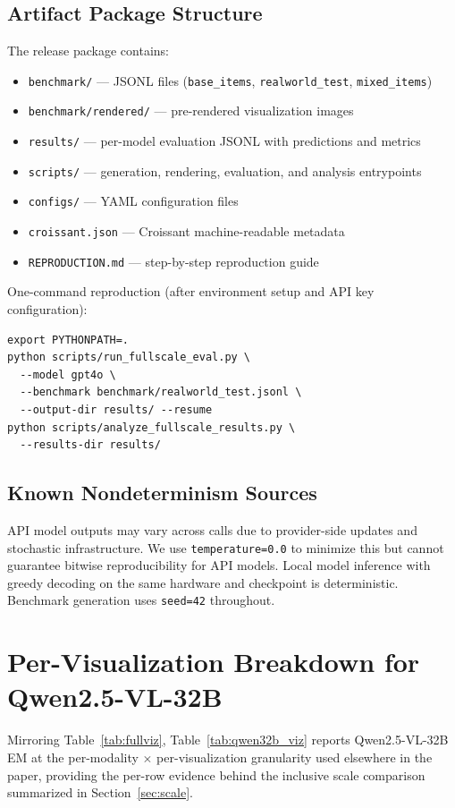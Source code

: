 \documentclass{article}
\begin{document}
\subsection{Artifact Package Structure}
The release package contains:
\begin{itemize}[leftmargin=1.5em]
    \item \texttt{benchmark/} --- JSONL files (\texttt{base\_items}, \texttt{realworld\_test}, \texttt{mixed\_items})
    \item \texttt{benchmark/rendered/} --- pre-rendered visualization images
    \item \texttt{results/} --- per-model evaluation JSONL with predictions and metrics
    \item \texttt{scripts/} --- generation, rendering, evaluation, and analysis entrypoints
    \item \texttt{configs/} --- YAML configuration files
    \item \texttt{croissant.json} --- Croissant machine-readable metadata
    \item \texttt{REPRODUCTION.md} --- step-by-step reproduction guide
\end{itemize}

One-command reproduction (after environment setup and API key configuration):
\begin{verbatim}
export PYTHONPATH=.
python scripts/run_fullscale_eval.py \
  --model gpt4o \
  --benchmark benchmark/realworld_test.jsonl \
  --output-dir results/ --resume
python scripts/analyze_fullscale_results.py \
  --results-dir results/
\end{verbatim}

\subsection{Known Nondeterminism Sources}
API model outputs may vary across calls due to provider-side updates and stochastic infrastructure. We use \texttt{temperature=0.0} to minimize this but cannot guarantee bitwise reproducibility for API models. Local model inference with greedy decoding on the same hardware and checkpoint is deterministic. Benchmark generation uses \texttt{seed=42} throughout.

\section{Per-Visualization Breakdown for Qwen2.5-VL-32B}
\label{sec:qwen32b_breakdown}
Mirroring Table~\ref{tab:fullviz}, Table~\ref{tab:qwen32b_viz} reports Qwen2.5-VL-32B EM at the per-modality $\times$ per-visualization granularity used elsewhere in the paper, providing the per-row evidence behind the inclusive scale comparison summarized in Section~\ref{sec:scale}.
\end{document}
